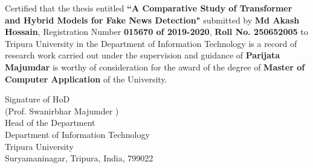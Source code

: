 \noindent Certified that the thesis entitled {\bf ``A Comparative Study of Transformer and Hybrid Models for Fake News Detection"} submitted by {\bf Md Akash Hossain}, Registration Number {\bf 015670 of 2019-2020}, {\bf Roll No. 250652005} to Tripura University in the Department of Information Technology is a record of research work carried out under the supervision and guidance of {\bf Parijata Majumdar} is worthy of consideration for the award of the degree of {\bf Master of Computer Application} of the University.



\vspace{.7 in}
\begin{flushright}
Signature of HoD\\ 
(Prof. Swanirbhar Majumder )\\
Head of the Department\\
Department of Information Technology\\
Tripura University\\
Suryamaninagar, Tripura, India, 799022 
\end{flushright}